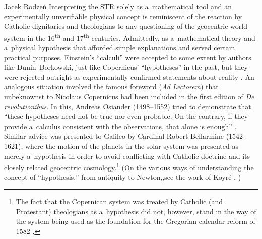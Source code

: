 \begin{artengenv}{Jacek Rodzeń}
Interpreting the STR solely as a~mathematical tool and an experimentally unverifiable physical concept is reminiscent of the reaction by Catholic dignitaries and theologians to any questioning of the geocentric world system in the 16\textsuperscript{th} and 17\textsuperscript{th} centuries. Admittedly, as a~mathematical theory and a~physical hypothesis that afforded simple explanations and served certain practical purposes, Einstein's ``calculi'' were accepted to some extent by authors like Dunin–Borkowski, just like Copernicus' ``hypotheses'' in the past, but they were rejected outright as experimentally confirmed statements about reality
\parencite[cf.][p.121]{benk_moderne_2000}. %
 An analogous situation involved the famous foreword (\textit{Ad Lectorem}) that unbeknownst to Nicolaus Copernicus had been included in the first edition of \textit{De revolutionibus}. In this, Andreas Osiander (1498–1552) tried to demonstrate that ``these hypotheses need not be true nor even probable. On the contrary, if they provide a~calculus consistent with the observations, that alone is enough'' 
\parencite[][p.XVI]{osiander_foreword_1978}. %
 Similar advice was presented to Galileo by Cardinal Robert Bellarmine (1542–1621), where the motion of the planets in the solar system was presented as merely a~hypothesis in order to avoid conflicting with Catholic doctrine and its closely related geocentric cosmology.\footnote{The fact that the Copernican system was treated by Catholic (and Protestant) theologians as a~hypothesis did not, however, stand in the way of the system being used as the foundation for the Gregorian calendar reform of 1582 
\parencite[cf.][p.326]{crombie_augustine_1953}.%
} (On the various ways of understanding the concept of ``hypothesis,'' from antiquity to Newton,,see the work of Koyré 
\parencite*[][pp.23–52]{koyre_newtonian_1968}.%
)


\end{artengenv}
